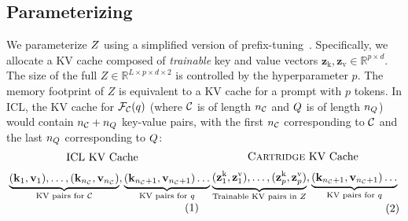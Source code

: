 \subsection{Parameterizing \artifacts}\label{sec:representing_cartridge}
\label{sec:artifact-parameterization}
We parameterize $Z$ using a simplified version of prefix-tuning~\cite{li2021prefix}.
Specifically, we allocate a KV cache composed of \textit{trainable} key and value vectors $\mathbf{z}_\text{k}, \mathbf{z}_\text{v} \in \mathbb{R}^{p \times d}$.
The size of the full $Z\in \mathbb{R}^{L \times p \times d \times 2}$ is controlled by the hyperparameter $p$.
The memory footprint of $Z$ is equivalent to a KV cache for a prompt with $p$ tokens.
In ICL, the KV cache for $\mathcal{F}_{\mathcal{C}}(q)$ (where $\mathcal{C}$ is of length $n_{\mathcal{C}}$ and $Q$ is of length $n_Q$) would contain $n_{\mathcal{C}} + n_Q$ key-value pairs, with the first $n_{\mathcal{C}}$ corresponding to $\mathcal{C}$ and the last $n_Q$ corresponding to $Q$:
\ifx\conference\neuripsconf
\[
\begin{minipage}{0.50\textwidth}
\centering
\text{ICL KV Cache} \vspace{-1.5em} \\
\begin{align*}
\underbrace{(\mathbf{k}_1, \mathbf{v}_1), \dots, (\mathbf{k}_{n_\ctx}, \mathbf{v}_{n_\ctx})}_{\text{KV pairs for~}\ctx},
\underbrace{(\mathbf{k}_{n_\ctx + 1}, \mathbf{v}_{n_\ctx + 1})\dots}_{\text{KV pairs for } \query }
\end{align*}
\end{minipage}
\quad
\begin{minipage}{0.50\textwidth}
\centering
\text{\artifact KV Cache} \vspace{-1.5em} \\
\begin{align*}
\underbrace{(\mathbf{z}^\text{k}_1, \mathbf{z}^\text{v}_1), \dots, (\mathbf{z}^\text{k}_{p}, \mathbf{z}^\text{v}_{p})}_{\text{Trainable KV pairs in }Z},
\underbrace{(\mathbf{k}_{n_\ctx + 1}, \mathbf{v}_{n_\ctx + 1})\dots}_{\text{KV pairs for } \query }
\end{align*}
\end{minipage}
\]
\fi
\ifx\conference\arxivconf
